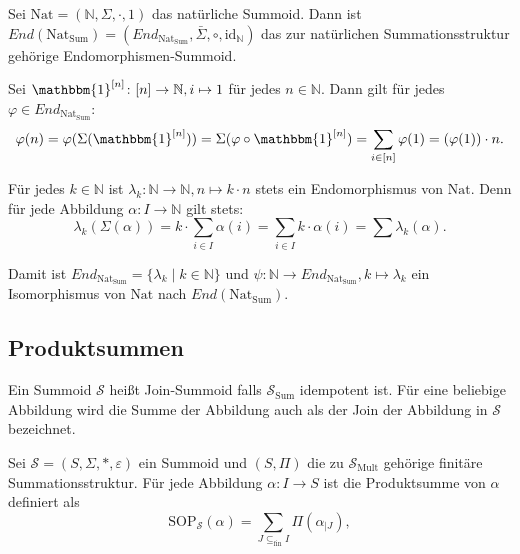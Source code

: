 \documentclass{article}
\begin{document}
\begin{example}
  Sei $\text{Nat} = (\mathbb{N}, \Sigma, \cdot, 1)$ das natürliche Summoid.
  Dann ist \\$End(\text{Nat}_\text{Sum}) = (End_{\text{Nat}_\text{Sum}}, \bar\Sigma, \circ, \text{id}_\mathbb{N})$ das zur natürlichen Summationsstruktur gehörige Endomorphismen-Summoid.

  Sei $\mathbbm{1}^{[n]} \colon [n] \to \mathbb{N}, i \mapsto 1$ für jedes $n \in \mathbb{N}$.
  Dann gilt für jedes $\varphi \in End_{\text{Nat}_\text{Sum}}$:
  \begin{equation*}
    \varphi(n) = \varphi(\Sigma(\mathbbm{1}^{[n]})) = \Sigma(\varphi \circ \mathbbm{1}^{[n]}) = \sum_{i \in [n]}\varphi(1) = (\varphi(1)) \cdot n.
  \end{equation*}

  Für jedes $k \in \mathbb{N}$ ist $\lambda_k \colon \mathbb{N} \to \mathbb{N}, n \mapsto k \cdot n$
  stets ein Endomorphismus von $\text{Nat}$.
  Denn für jede Abbildung $\alpha \colon I \to \mathbb{N}$ gilt stets:
  \begin{equation*}
    \lambda_k(\Sigma(\alpha)) = k \cdot \sum_{i \in I}\alpha(i) = \sum_{i \in I}k \cdot \alpha(i) = \sum \lambda_k(\alpha).
  \end{equation*}

  Damit ist $End_{\text{Nat}_\text{Sum}} = \{\lambda_k \mid k \in \mathbb{N}\}$
  und $\psi \colon \mathbb{N} \to End_{\text{Nat}_\text{Sum}}, k \mapsto \lambda_k$
  ein Isomorphismus von $\text{Nat}$ nach $End(\text{Nat}_\text{Sum})$.
\end{example}

\subsection{Produktsummen}

\begin{definition}
  Ein Summoid $\mathcal{S}$ heißt Join-Summoid falls $\mathcal{S}_\text{Sum}$ idempotent ist.
  Für eine beliebige Abbildung wird die Summe der Abbildung auch als der Join der Abbildung in $\mathcal{S}$ bezeichnet.
\end{definition}

\begin{definition}
  Sei $\mathcal{S} = (S, \Sigma, \ast, \varepsilon)$ ein Summoid und $(S, \Pi)$ die zu $\mathcal{S}_\text{Mult}$ gehörige finitäre Summationsstruktur.
  Für jede Abbildung $\alpha \colon I \to S$ ist die Produktsumme von $\alpha$ definiert als
  \begin{equation*}
    \text{SOP}_\mathcal{S}(\alpha) = \sum_{J \subseteq_\text{fin} I}\Pi(\alpha_{\mid J}),
  \end{equation*}
\end{definition}
\end{document}

